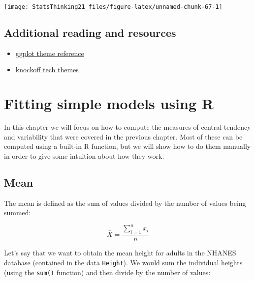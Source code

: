 \documentclass[12pt,]{book}
\newenvironment{Shaded}{\begin{snugshade}}{\end{snugshade}}
\newcommand{\KeywordTok}[1]{\textcolor[rgb]{0.13,0.29,0.53}{\textbf{#1}}}
\newcommand{\NormalTok}[1]{#1}
\newcommand{\OperatorTok}[1]{\textcolor[rgb]{0.81,0.36,0.00}{\textbf{#1}}}
\newcommand{\StringTok}[1]{\textcolor[rgb]{0.31,0.60,0.02}{#1}}
\begin{document}
\texttt{[image: StatsThinking21\_files/figure-latex/unnamed-chunk-67-1]}

\hypertarget{additional-reading-and-resources}{%
\section{Additional reading and resources}\label{additional-reading-and-resources}}

\begin{itemize}
\item
  \href{http://ggplot2.tidyverse.org/reference/ggtheme.html}{ggplot theme reference}
\item
  \href{https://exts.ggplot2.tidyverse.org/}{knockoff tech themes}
\end{itemize}

\hypertarget{fitting-simple-models-using-r}{%
\chapter{Fitting simple models using R}\label{fitting-simple-models-using-r}}

In this chapter we will focus on how to compute the measures of central tendency and variability that were covered in the previous chapter. Most of these can be computed using a built-in R function, but we will show how to do them manually in order to give some intuition about how they work.

\hypertarget{mean}{%
\section{Mean}\label{mean}}

The mean is defined as the sum of values divided by the number of values being summed:

\[
\bar{X} = \frac{\sum_{i=1}^{n}x_i}{n}
\]

Let's say that we want to obtain the mean height for adults in the NHANES database (contained in the data \texttt{Height}). We would sum the individual heights (using the \texttt{sum()} function) and then divide by the number of values:

\begin{Shaded}
\end{Shaded}
\end{document}
